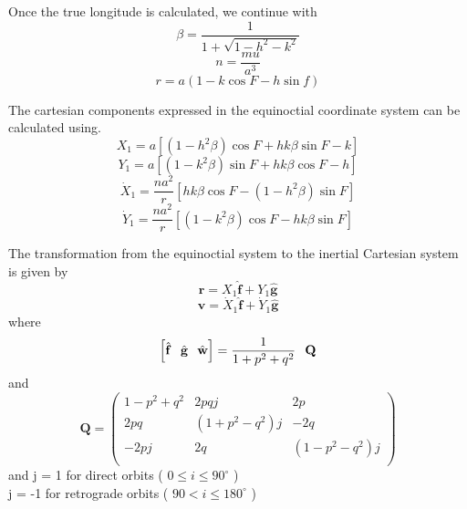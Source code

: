 Once the true longitude is calculated, we continue with
%
\begin{equation}
   \beta = \frac{1}{1 + \sqrt{1 - h^2 - k^2}} \label{Eq:Beta}
\end{equation}
%
\begin{equation}
   n = \frac{mu}{a^3}
\end{equation}
%
\begin{equation}
   r = a(1 - k\cos{F} - h\sin{f})
\end{equation}

The cartesian components expressed in the equinoctial coordinate
system can be calculated using.
%
\begin{equation}
   X_1 = a\left[ ( 1 - h^2 \beta) \cos{F} + h k \beta \sin{F} - k   \right]
\end{equation}
%
\begin{equation}
   Y_1 = a\left[ ( 1 - k^2 \beta) \sin{F} + h k \beta \cos{F} - h   \right]
\end{equation}
%
\begin{equation}
  \dot{X}_1 = \frac{n a^2}{r}\left[h k \beta \cos{F} - (1 - h^2 \beta)\sin{F}   \right]
\end{equation}
%
\begin{equation}
  \dot{Y}_1 = \frac{n a^2}{r}\left[  (1 - k^2 \beta)\cos{F}  -  h k \beta \sin{F}   \right]
\end{equation}
%

The transformation from the equinoctial system to the inertial
Cartesian system is given by
%
\begin{equation}
   \mathbf{r} = X_1 \hat{\mathbf{f}} + Y_1 \hat{\mathbf{g}}
\end{equation}
%
\begin{equation}
   \mathbf{v} = \dot{X}_1 \hat{\mathbf{f}} + \dot{Y}_1 \hat{\mathbf{g}}
\end{equation}
%
where
%
\begin{equation}
    \left[ \hat{\mathbf{f}} \hspace{.1 in} \hat{\mathbf{g}} \hspace{.1 in} \hat{\mathbf{w}}
    \right]=  \frac{1}{1+p^2+q^2}\hspace{.1 in} \mathbf{Q}
\end{equation}
%
and
%
\begin{equation} \mathbf{Q} =
 \begin{pmatrix}
               1 - p^2 + q^2 &
               2 p q j &
               2 p \\
%
               2 p q&
               \left( 1 + p^2 - q^2 \right)j &
               -2 q \\
               - 2 p j&
               2 q &
               \left(1 - p^2 - q^2  \right)j \\
     \end{pmatrix}
\end{equation}
%
and
%
\noindent j = 1 for direct orbits ( $0\leq i \leq 90^{\circ}$ )\\
 j = -1 for retrograde orbits ( $90 < i \leq 180^{\circ}$ )\\

